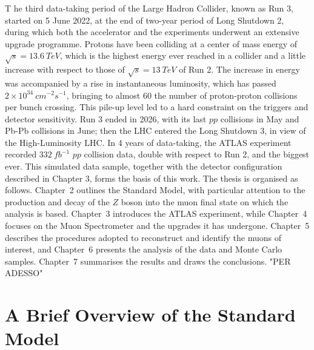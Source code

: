 \documentclass[11pt,a4paper,twoside,openright]{report}
\begin{document}
\lettrine[lines=3,loversize=0.1,lraise=0.05]{T}{} he third data-taking period of the Large Hadron Collider, known as Run 3, started on 5 June 2022, at the end of two-year period of Long Shutdown 2, during which both the accelerator and the experiments underwent an extensive upgrade programme. Protons have been colliding at a center of mass energy of \(\sqrt{s}=13.6\ TeV\), which is the highest energy ever reached in a collider and a little increase with respect to those of \(\sqrt{s}=13\ TeV\) of Run 2.  The increase in energy was accompanied by a rise in instantaneous luminosity, which has passed \(2\times10^{34}\ cm^{-2}s^{-1}\), bringing to almost 60 the number of proton-proton collisions per bunch crossing. This pile-up level led to a hard constraint on the triggers and detector sensitivity. Run 3 ended in 2026, with its last \(pp\) collisions in May and Pb-Pb collisions in June; then the LHC entered the Long Shutdown 3, in view of the High-Luminosity LHC. In 4 years of data-taking, the ATLAS experiment recorded \(332\ fb^{-1}\) \(pp\) collision data, double with respect to Run 2, and the biggest ever. This simulated data sample, together with the detector configuration described in Chapter 3, forms the basis of this work. The thesis is organised as follows. Chapter~2 outlines the Standard Model, with particular attention to the production and decay of the $Z$ boson into the muon final state on which the analysis is based. Chapter~3 introduces the ATLAS experiment, while Chapter~4 focuses on the Muon Spectrometer and the upgrades it has undergone. Chapter~5 describes the procedures adopted to reconstruct and identify the muons of interest, and Chapter~6 presents the analysis of the data and Monte Carlo samples. Chapter~7 summarises the results and draws the conclusions. "PER ADESSO"



\clearpage

\chapter{A Brief Overview of the Standard Model}
\end{document}
